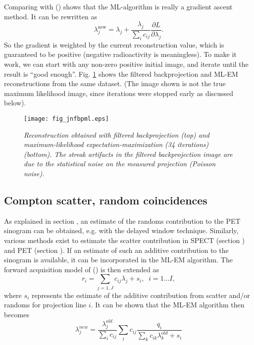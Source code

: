 Comparing with () shows that the ML-algorithm is really a
gradient ascent method. It can be rewritten as
\begin{equation}
 \lambda_j^{\mbox{new}} = \lambda_j 
    + \frac{\lambda_j}{\sum_i c_{ij}} \frac{\partial L}{\partial \lambda_j}.
\end{equation}
So the gradient is weighted by the current reconstruction value, which is
guaranteed to be positive (negative radioactivity is meaningless). To make it
work, we can start with any non-zero positive initial image, and iterate until
the result is ``good enough''. Fig. \ref{fig:jnfbpml} shows the filtered
backprojection and ML-EM reconstructions from the same dataset. (The image
shown is not the true maximum likelihood image, since iterations were stopped
early as discussed below).
\begin{figure}[tb]
\centering
\texttt{[image: fig\_jnfbpml.eps]}
\caption{\label{fig:jnfbpml} \emph{Reconstruction obtained with filtered
backprojection (top) and maximum-likelihood expectation-maximization (34
iterations) (bottom). The streak artifacts in the filtered backprojection
image are due to the statistical noise on the measured projection (Poisson
noise).}}
\end{figure}

\subsection{Compton scatter, random coincidences}
As explained in section , an estimate of the randoms
contribution to the PET sinogram can be obtained, e.g. with the
delayed window technique. Similarly, various methods exist to estimate
the scatter contribution in SPECT (section )
and PET (section ). If an estimate of such an
additive contribution to the sinogram is available, it can be
incorporated in the ML-EM algorithm. The forward acquisition model
of () is then extended as 
\begin{equation}
  r_i = \sum_{j=1,J} c_{ij} \lambda_j + s_i, \;\; i = 1 \ldots I,
  \label{jn:mlprojscat}
\end{equation}
where $s_i$ represents the estimate of the additive contribution from
scatter and/or randoms for projection line $i$. It can be shown that
the ML-EM algorithm then becomes
\begin{equation}
  \lambda_j^{new}  =  \frac{\lambda_j^{old}}{\sum_i c_{ij}}
           \sum_i c_{ij}  \frac{q_i}{\sum_k c_{ik} \lambda_k^{old} + s_i}
           \label{eq:jnmlemscat}
\end{equation}



